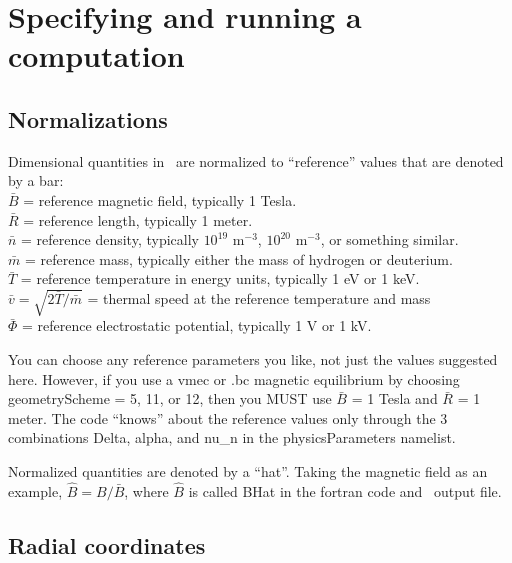 \chapter{Specifying and running a computation}

\section{Normalizations}

{\setlength{\parindent}{0cm}
Dimensional quantities in \sfincs~are normalized to ``reference'' values that are denoted by a bar:\\
$\bar{B}$ = reference magnetic field, typically 1 Tesla.\\
$\bar{R}$ = reference length, typically 1 meter.\\
$\bar{n}$ = reference density, typically $10^{19}$ m$^{-3}$, $10^{20}$ m$^{-3}$, or something similar.\\
$\bar{m}$ = reference mass, typically either the mass of hydrogen or deuterium.\\
$\bar{T}$ = reference temperature in energy units, typically 1 eV or 1 keV.\\
$\bar{v} = \sqrt{2 \bar{T} / \bar{m}}$ = thermal speed at the reference temperature and mass\\
$\bar{\Phi}$ = reference electrostatic potential, typically 1 V or 1 kV.\\
}

You can choose any reference parameters you like, not just the values
suggested here. However, if you use a {\ttfamily vmec} or {\ttfamily .bc} magnetic equilibrium
by choosing {\ttfamily geometryScheme} = 5, 11, or 12, then you MUST use $\bar{B}$ = 1 Tesla and $\bar{R}$ = 1 meter.
The code ``knows'' about the reference values only through
the 3 combinations {\ttfamily Delta}, {\ttfamily alpha}, and {\ttfamily nu\_n}
in the {\ttfamily physicsParameters} namelist.

Normalized quantities are denoted by a ``hat''.  Taking the magnetic field as an example,
$\hat{B}=B/\bar{B}$, where $\hat{B}$ is called {\ttfamily BHat} in the fortran code and \HDF~output file.

\section{Radial coordinates}
\label{sec:radialCoordinates}

